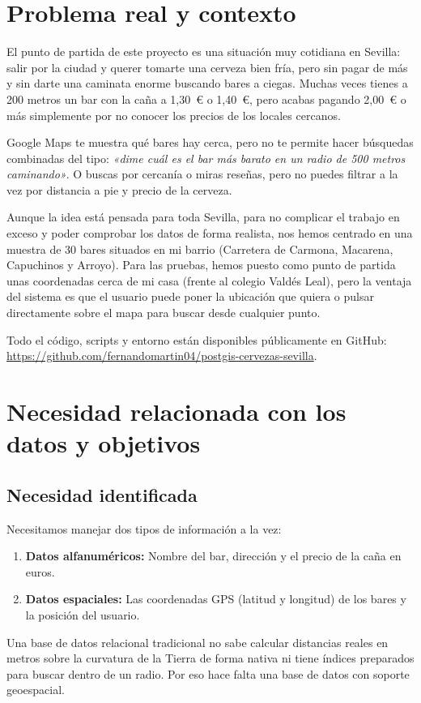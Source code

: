 \documentclass[a4paper,12pt]{article}
\newcommand{\RepoURL}{https://github.com/fernandomartin04/postgis-cervezas-sevilla}
\begin{document}
\section{Problema real y contexto}

El punto de partida de este proyecto es una situación muy cotidiana en Sevilla: salir por la ciudad y querer tomarte una cerveza bien fría, pero sin pagar de más y sin darte una caminata enorme buscando bares a ciegas. Muchas veces tienes a 200 metros un bar con la caña a 1,30~\euro{} o 1,40~\euro{}, pero acabas pagando 2,00~\euro{} o más simplemente por no conocer los precios de los locales cercanos.

Google Maps te muestra qué bares hay cerca, pero no te permite hacer búsquedas combinadas del tipo: \textit{«dime cuál es el bar más barato en un radio de 500 metros caminando»}. O buscas por cercanía o miras reseñas, pero no puedes filtrar a la vez por distancia a pie y precio de la cerveza.

Aunque la idea está pensada para toda Sevilla, para no complicar el trabajo en exceso y poder comprobar los datos de forma realista, nos hemos centrado en una muestra de 30 bares situados en mi barrio (Carretera de Carmona, Macarena, Capuchinos y Arroyo). Para las pruebas, hemos puesto como punto de partida unas coordenadas cerca de mi casa (frente al colegio Valdés Leal), pero la ventaja del sistema es que el usuario puede poner la ubicación que quiera o pulsar directamente sobre el mapa para buscar desde cualquier punto.

Todo el código, scripts y entorno están disponibles públicamente en GitHub: \url{\RepoURL}.

\section{Necesidad relacionada con los datos y objetivos}

\subsection{Necesidad identificada}
Necesitamos manejar dos tipos de información a la vez:
\begin{enumerate}
    \item \textbf{Datos alfanuméricos:} Nombre del bar, dirección y el precio de la caña en euros.
    \item \textbf{Datos espaciales:} Las coordenadas GPS (latitud y longitud) de los bares y la posición del usuario.
\end{enumerate}
Una base de datos relacional tradicional no sabe calcular distancias reales en metros sobre la curvatura de la Tierra de forma nativa ni tiene índices preparados para buscar dentro de un radio. Por eso hace falta una base de datos con soporte geoespacial.
\end{document}

